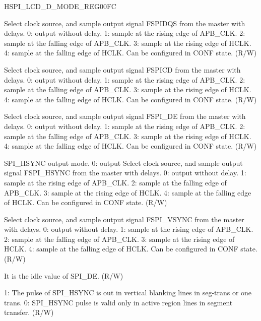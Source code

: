 \begin{register}{H}{SPI\_LCD\_D\_MODE\_REG}{\hexprefix{}00FC}\label{regdesc:SPILCDDMODEREG}
%
%
%
%
%
%
%
%
\regnewline%
\begin{regdesc}\begin{reglist}
\label{fielddesc:SPIDDQSMODE}\item [SPI\_D\_DQS\_MODE]
Select clock source, and sample output signal FSPIDQS from the master with delays. 0: output without delay. 1: sample at the rising edge of APB\_CLK. 2: sample at the falling edge of APB\_CLK. 3: sample at the rising edge of HCLK. 4: sample at the falling edge of HCLK. Can be configured in CONF state. (R/W)
\label{fielddesc:SPIDCDMODE}\item [SPI\_D\_CD\_MODE]
Select clock source, and sample output signal FSPICD from the master with delays. 0: output without delay. 1: sample at the rising edge of APB\_CLK. 2: sample at the falling edge of APB\_CLK. 3: sample at the rising edge of HCLK. 4: sample at the falling edge of HCLK. Can be configured in CONF state. (R/W)
\label{fielddesc:SPIDDEMODE}\item [SPI\_D\_DE\_MODE] Select clock source, and sample output signal FSPI\_DE from the master with delays. 0: output without delay. 1: sample at the rising edge of APB\_CLK. 2: sample at the falling edge of APB\_CLK. 3: sample at the rising edge of HCLK. 4: sample at the falling edge of HCLK. Can be configured in CONF state. (R/W)
\label{fielddesc:SPIDHSYNCMODE}\item [SPI\_D\_HSYNC\_MODE] SPI\_HSYNC output mode. 0: output Select clock source, and sample output signal FSPI\_HSYNC from the master with delays. 0: output without delay. 1: sample at the rising edge of APB\_CLK. 2: sample at the falling edge of APB\_CLK. 3: sample at the rising edge of HCLK. 4: sample at the falling edge of HCLK. Can be configured in CONF state. (R/W)
\label{fielddesc:SPIDVSYNCMODE}\item [SPI\_D\_VSYNC\_MODE] Select clock source, and sample output signal FSPI\_VSYNC from the master with delays. 0: output without delay. 1: sample at the rising edge of APB\_CLK. 2: sample at the falling edge of APB\_CLK. 3: sample at the rising edge of HCLK. 4: sample at the falling edge of HCLK. Can be configured in CONF state. (R/W)
\label{fielddesc:SPIDEIDLEPOL}\item [SPI\_DE\_IDLE\_POL] It is the idle value of SPI\_DE. (R/W)
\label{fielddesc:SPIHSBLANKEN}\item [SPI\_HS\_BLANK\_EN] 1: The pulse of SPI\_HSYNC is out in vertical blanking lines in seg-trans or one trans. 0: SPI\_HSYNC pulse is valid only in active region lines in segment transfer. (R/W)
\end{reglist}\end{regdesc}
\end{register}


